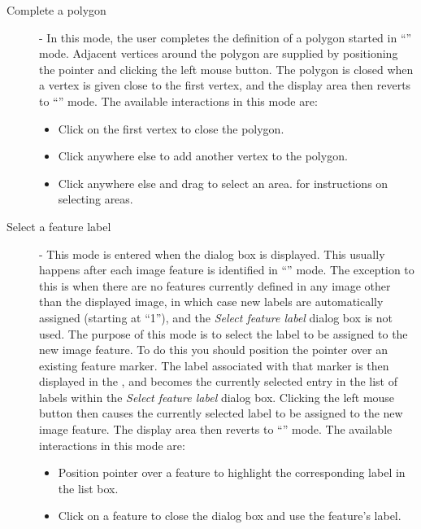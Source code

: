 \documentclass[11pt,nolof]{starlink}
\providecommand{\mylabel}[1] {\xlabel{#1}\label{#1}}
\begin{document}
\begin{description}
\begin{itemize}
\end{itemize}

\item [\mylabel{POLKA_MODE_2} Complete a polygon] - In this mode, the
user completes the definition of a polygon started in ``'' mode. Adjacent vertices around the
polygon are supplied by positioning the pointer and clicking the left
mouse button. The polygon is closed when a vertex is given close to the
first vertex, and the display area then reverts to ``'' mode. The available interactions in
this mode are:

\begin{itemize}
\item Click on the first vertex to close the polygon.
\item Click anywhere else to add another vertex to the polygon.
\item Click anywhere else and drag to select an area.  for instructions on selecting areas.
\end{itemize}

\item [\mylabel{POLKA_MODE_3} Select a feature label] - This mode is
entered when the 
dialog box is displayed. This usually happens after each image feature is
identified in ``'' mode. The
exception to this is when there are no features currently defined in any
image other than the displayed image, in which case new labels are
automatically assigned (starting at ``1''), and the \emph{Select feature
label} dialog box is not used. The purpose of this mode is to select the
label to be assigned to the new image feature. To do this you should
position the pointer over an existing feature marker. The label
associated with that marker is then displayed in the , and becomes the currently selected entry in
the list of labels within the \emph{Select feature label} dialog box.
Clicking the left mouse button then causes the currently selected label
to be assigned to the new image feature. The display area then reverts to
``'' mode.
The available interactions in this mode are:

\begin{itemize}
\item Position pointer over a feature to highlight the corresponding label
in the list box.
\item Click on a feature to close the dialog box and use the feature's label.
\end{itemize}


\end{description}
\end{document}
